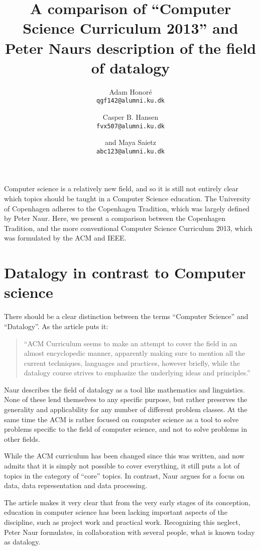 \documentclass[11pt,a4paper]{article}
\title{A comparison of “Computer Science Curriculum 2013” and Peter Naurs description of the field of datalogy}
\author
{
	Adam Honoré\\
	{\tt qgf142@alumni.ku.dk}
	\and
	Casper B. Hansen\\
	{\tt fvx507@alumni.ku.dk}
	\and
	and Maya Saietz\\
	{\tt abc123@alumni.ku.dk}
}
\begin{document}
\maketitle

\noindent Computer science is a relatively new field, and so it is still not entirely clear which topics should be taught in a
Computer Science education. The University of Copenhagen adheres to the Copenhagen Tradition, which was largely defined
by Peter Naur. Here, we present a comparison between the Copenhagen Tradition, and the more conventional Computer
Science Curriculum 2013, which was formulated by the ACM and IEEE.

\section{Datalogy in contrast to Computer science}
There should be a clear distinction between the terms ``Computer Science'' and ``Datalogy''. As the article\cite{froekjaer88} puts it:

\begin{quote}
    ``ACM Curriculum seems to make an attempt to cover the field in an almost encyclopedic manner, apparently making sure to
    mention all the current techniques, languages and practices, however briefly, while the datalogy course strives to
    emphasize the underlying ideas and principles.''
\end{quote}

Naur describes the field of datalogy as a tool like mathematics and linguistics. None of these lend themselves to any
specific purpose, but rather preserves the generality and applicability for any number of different problem classes. At
the same time the ACM is rather focused on computer science as a tool to solve problems specific to the field of
computer science, and not to solve problems in other fields.

While the ACM curriculum has been changed since this was written, and now admits that it is simply not possible to cover
everything, it still puts a lot of topics in the category of ``core'' topics. In contrast, Naur argues for a focus on
data, data representation and data processing\cite{naur66}.

The article\cite{froekjaer88} makes it very clear that from the very early stages of its conception, education in computer science has
been lacking important aspects of the discipline, such as project work and practical work. Recognizing this neglect,
Peter Naur formulates, in collaboration with several people, what is known today as datalogy.
\end{document}
